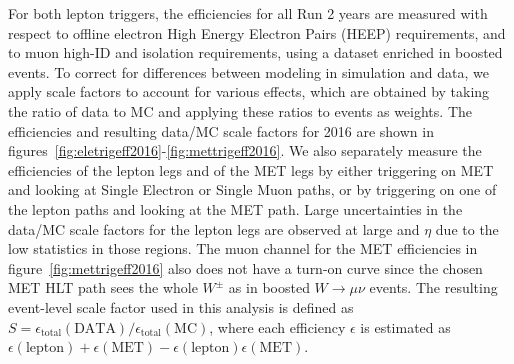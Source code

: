 For both lepton triggers, the efficiencies for all Run 2 years are measured with respect to offline electron High Energy Electron Pairs (HEEP) requirements, and to muon high-\pt ID and isolation requirements, using a dataset enriched in boosted \Wjets events.
To correct for differences between modeling in simulation and data, we apply scale factors to account for various effects, which are obtained by taking the ratio of data to MC and applying these ratios to events as weights.
The efficiencies and resulting data/MC scale factors for 2016 are shown in figures~\ref{fig:eletrigeff2016}-\ref{fig:mettrigeff2016}.
We also separately measure the efficiencies of the lepton legs and of the MET legs by either triggering on MET and looking at Single Electron or Single Muon paths, or by triggering on one of the lepton paths and looking at the MET path.
Large uncertainties in the data/MC scale factors for the lepton legs are observed at large \pt and $\eta$ due to the low statistics in those regions.
The muon channel for the MET efficiencies in figure~\ref{fig:mettrigeff2016} also does not have a turn-on curve since the chosen MET HLT path sees the whole $W^\pm$ as \ptmiss in boosted $W\to\mu\nu$ events.
The resulting event-level scale factor used in this analysis is defined as $S=\epsilon_\mathrm{total}(\mathrm{DATA})/\epsilon_\mathrm{total}(\mathrm{MC})$, where each efficiency $\epsilon$ is estimated as $\epsilon(\mathrm{lepton})+\epsilon(\mathrm{MET})-\epsilon(\mathrm{lepton})\epsilon(\mathrm{MET})$.

